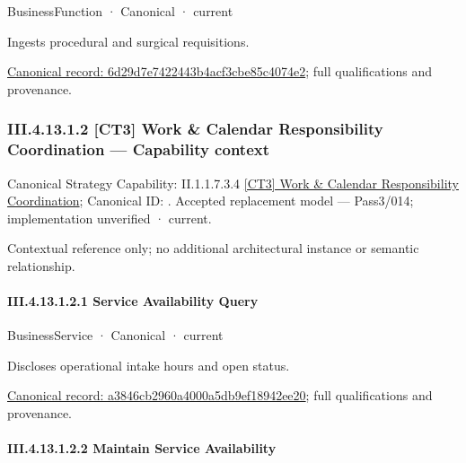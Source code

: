 \label{element:6d29d7e7422443b4acf3cbe85c4074e2}
{\small BusinessFunction · Canonical · current}\par

Ingests procedural and surgical requisitions.


{\footnotesize \href{../../../../../../../../continuum/business/business-function/6d29d7e7422443b4acf3cbe85c4074e2.md}{Canonical record: 6d29d7e7422443b4acf3cbe85c4074e2}; full qualifications and provenance.}\par
\subsubsection*{III.4.13.1.2 [CT3] Work \& Calendar Responsibility Coordination — Capability context}
\label{navigation:III.4.13.1.2}

{\small Canonical Strategy Capability: II.1.1.7.3.4 \hyperref[element:8ead6499039b4a9ea14beeae7d0ff6f4]{[CT3] Work \& Calendar Responsibility Coordination}; Canonical ID: \texttt{}. Accepted replacement model — Pass3/014; implementation unverified · current.}\par
Contextual reference only; no additional architectural instance or semantic relationship.\par
\paragraph*{III.4.13.1.2.1 Service Availability Query}
\label{navigation:III.4.13.1.2.1}

\label{element:a3846cb2960a4000a5db9ef18942ee20}
{\small BusinessService · Canonical · current}\par

Discloses operational intake hours and open status.


{\footnotesize \href{../../../../../../../../continuum/business/business-service/a3846cb2960a4000a5db9ef18942ee20.md}{Canonical record: a3846cb2960a4000a5db9ef18942ee20}; full qualifications and provenance.}\par
\paragraph*{III.4.13.1.2.2 Maintain Service Availability}
\label{navigation:III.4.13.1.2.2}

